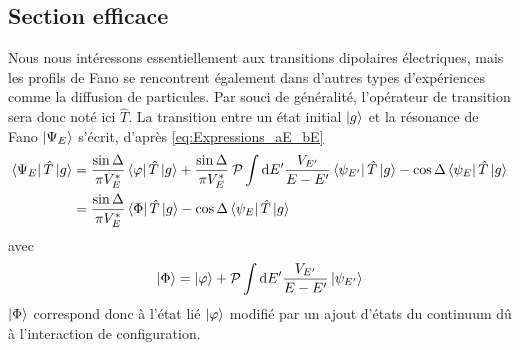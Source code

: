 \subsection{Section efficace}
Nous nous intéressons essentiellement aux transitions dipolaires électriques, mais les profils de Fano se rencontrent également dans d'autres types d'expériences comme la diffusion de particules. Par souci de généralité, l'opérateur de transition sera donc noté ici $\hat{T}$. La transition entre un état initial $\ket{g}$ et la résonance de Fano $\ket{\Psi_E}$ s'écrit, d'après \ref{eq:Expressions_aE_bE}
\begin{align}
\bra{\Psi_E} \hat{T} \ket{g} & = \frac{\sin \Delta}{\pi V^*_E} \bra{\varphi} \hat{T} \ket{g} + \frac{\sin \Delta}{\pi V^*_E} \: \mathcal{P} \int \mathrm{d} E' \frac{V_{E'}}{E-E'} \bra{\psi_{E'}} \hat{T} \ket{g} - \cos \Delta \bra{\psi_E} \hat{T} \ket{g} \\
& = \frac{\sin \Delta}{\pi V^*_E} \bra{\Phi} \hat{T} \ket{g} -  \cos \Delta \bra{\psi_E} \hat{T} \ket{g} 
\end{align}
avec
\begin{equation}
\ket{\Phi} = \ket{\varphi} + \mathcal{P} \int \mathrm{d} E' \frac{V_{E'}}{E-E'} \ket{\psi_{E'}}
\end{equation}
$\ket{\Phi}$ correspond donc à l'état lié $\ket{\varphi}$ modifié par un ajout d'états du continuum dû à l'interaction de configuration.

